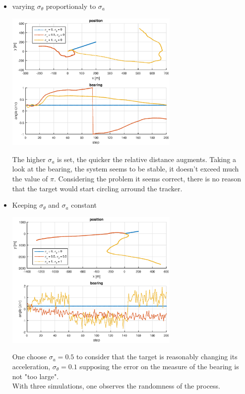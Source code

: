 \documentclass[english,DIV=13]{scrreprt}
\begin{document}
\begin{itemize}
\item varying $\sigma_\theta$ proportionaly to $\sigma_a$
\begin{center}
\includegraphics[width=0.66\textwidth]{img/q2_3.eps}
\end{center}
The higher $\sigma_a$ is set, the quicker the relative distance augments. Taking a look at the bearing,
the system seems to be stable, it doesn't exceed much the value of $\pi$. Considering the problem
it seems correct, there is no reason that the target would start circling arround the tracker. 

\item  Keeping $\sigma_\theta$ and $\sigma_a$ constant

\begin{center}
 \includegraphics[width=0.66\textwidth]{img/q2_4.eps}
\end{center}
One choose 	$\sigma_a=0.5$ to consider that the target is reasonably changing its acceleration, 
$\sigma_{\theta}=0.1$ supposing the error on the measure of the bearing is not "too large". \\
With three simulations, one observes the randomness of the process.
\end{itemize}
\end{document}
